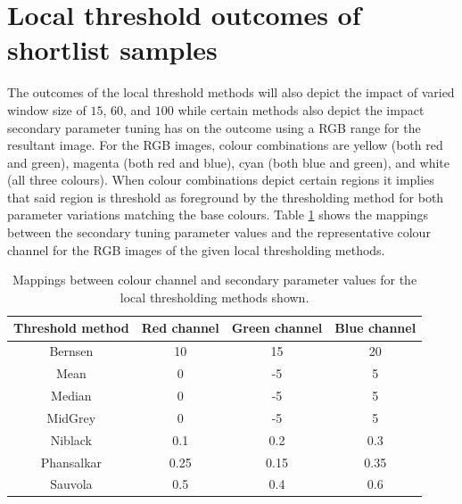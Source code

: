 \section{Local threshold outcomes of shortlist samples}\label{appen_sec:local_shortlist}
The outcomes of the local threshold methods will also depict the impact of varied window size of $15$, $60$, and $100$ while certain methods also depict the impact secondary parameter tuning has on the outcome using a RGB range for the resultant image. For the RGB images, colour combinations are yellow (both red and green), magenta (both red and blue), cyan (both blue and green), and white (all three colours). When colour combinations depict certain regions it implies that said region is threshold as foreground by the thresholding method for both parameter variations matching the base colours. Table \ref{appen_table:shortlist_colour_mappings} shows the mappings between the secondary tuning parameter values and the representative colour channel for the RGB images of the given local thresholding methods.
\begin{table}[hb!]
	\centering
	\begin{tabular}{|c|c|c|c|}
		\hline
		\textbf{Threshold method} & \textbf{Red channel} & \textbf{Green channel} & \textbf{Blue channel} \\
		\hline
		Bernsen & 10 & 15 & 20 \\
		\hline
		Mean & 0 & -5 & 5 \\
		\hline
		Median & 0 & -5 & 5 \\
		\hline
		MidGrey & 0 & -5 & 5 \\
		\hline
		Niblack & 0.1 & 0.2 & 0.3 \\
		\hline
		Phansalkar & 0.25 & 0.15 & 0.35 \\
		\hline
		Sauvola & 0.5 & 0.4 & 0.6 \\
		\hline
	\end{tabular}
	\caption{Mappings between colour channel and secondary parameter values for the local thresholding methods shown.}
	\label{appen_table:shortlist_colour_mappings}
\end{table}


